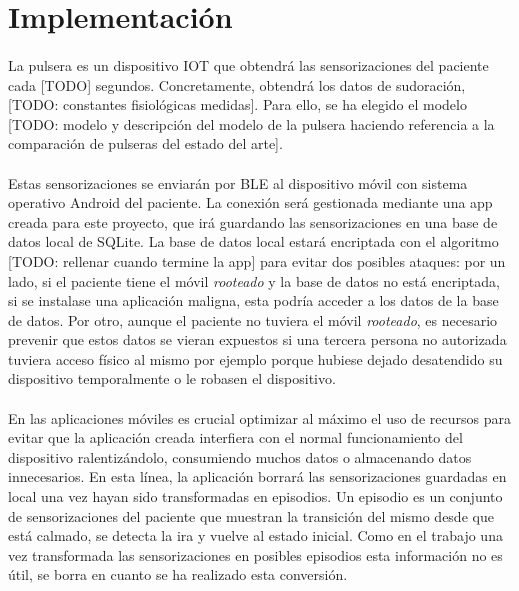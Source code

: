 \section{Implementación}
\label{sec:c4:impl}
\paragraph{}
La pulsera es un dispositivo IOT que obtendrá las sensorizaciones del paciente cada [TODO] segundos. Concretamente, obtendrá los datos de sudoración, [TODO: constantes fisiológicas medidas]. Para ello, se ha elegido el modelo [TODO: modelo y descripción del modelo de la pulsera haciendo referencia a la comparación de pulseras del estado del arte].

\paragraph{}
Estas sensorizaciones se enviarán por BLE al dispositivo móvil con sistema operativo Android del paciente. La conexión será gestionada mediante una app creada para este proyecto, que irá guardando las sensorizaciones en una base de datos local de SQLite. La base de datos local estará encriptada con el algoritmo [TODO: rellenar cuando termine la app] para evitar dos posibles ataques: por un lado, si el paciente tiene el móvil \textit{rooteado} y la base de datos no está encriptada, si se instalase una aplicación maligna, esta podría acceder a los datos de la base de datos. Por otro, aunque el paciente no tuviera el móvil \textit{rooteado}, es necesario prevenir que estos datos se vieran expuestos si una tercera persona no autorizada tuviera acceso físico al mismo por ejemplo porque hubiese dejado desatendido su dispositivo temporalmente o le robasen el dispositivo.

\paragraph{}
En las aplicaciones móviles es crucial optimizar al máximo el uso de recursos para evitar que la aplicación creada interfiera con el normal funcionamiento del dispositivo ralentizándolo, consumiendo muchos datos o almacenando datos innecesarios. En esta línea, la aplicación borrará las sensorizaciones guardadas en local una vez hayan sido transformadas en episodios. Un episodio es un conjunto de sensorizaciones del paciente que muestran la transición del mismo desde que está calmado, se detecta la ira y vuelve al estado inicial. Como en el trabajo una vez transformada las sensorizaciones en posibles episodios esta información no es útil, se borra en cuanto se ha realizado esta conversión.

